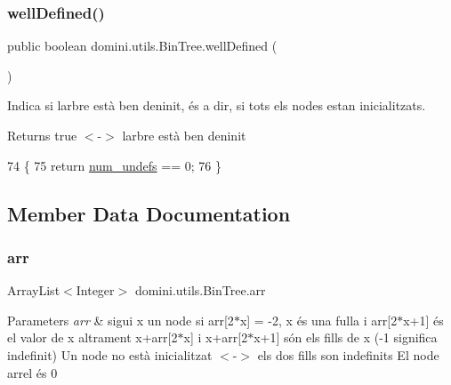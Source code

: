 \subsubsection{\texorpdfstring{well\+Defined()}{wellDefined()}}
{\footnotesize\ttfamily public boolean domini.\+utils.\+Bin\+Tree.\+well\+Defined (\begin{DoxyParamCaption}{ }\end{DoxyParamCaption})\hspace{0.3cm}{\ttfamily [inline]}}



Indica si l\textquotesingle{}arbre està ben deninit, és a dir, si tots els nodes estan inicialitzats. 

\begin{DoxyReturn}{Returns}
true $<$-\/$>$ l\textquotesingle{}arbre està ben deninit 
\end{DoxyReturn}

\begin{DoxyCode}
74                                  \{
75         \textcolor{keywordflow}{return} \hyperlink{classdomini_1_1utils_1_1BinTree_a36f1212262c353accbc0a0385fa45a8d}{num\_undefs} == 0;
76     \}
\end{DoxyCode}


\subsection{Member Data Documentation}
\mbox{\label{classdomini_1_1utils_1_1BinTree_a357bcbcf07ba7fcb99d11b237d189e65}} 
\subsubsection{\texorpdfstring{arr}{arr}}
{\footnotesize\ttfamily Array\+List$<$Integer$>$ domini.\+utils.\+Bin\+Tree.\+arr\hspace{0.3cm}{\ttfamily [private]}}


\begin{DoxyParams}{Parameters}
{\em arr} & sigui x un node si arr\mbox{[}2$\ast$x\mbox{]} = -\/2, x és una fulla i arr\mbox{[}2$\ast$x+1\mbox{]} és el valor de x altrament x+arr\mbox{[}2$\ast$x\mbox{]} i x+arr\mbox{[}2$\ast$x+1\mbox{]} són els fills de x (-\/1 significa indefinit) Un node no està inicialitzat $<$-\/$>$ els dos fills son indefinits El node arrel és 0 \\
\hline
\end{DoxyParams}
\mbox{\label{classdomini_1_1utils_1_1BinTree_a36f1212262c353accbc0a0385fa45a8d}} 

